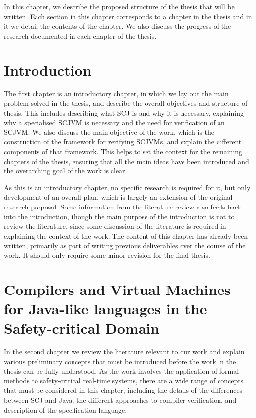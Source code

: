 \documentclass[a4paper,10pt]{report}
\begin{document}
In this chapter, we describe the proposed structure of the thesis that
will be written.
Each section in this chapter corresponds to a chapter in the thesis
and in it we detail the contents of the chapter.
We also discuss the progress of the research documented in each
chapter of the thesis.

\section{Introduction}

The first chapter is an introductory chapter, in which we lay out the
main problem solved in the thesis, and describe the overall objectives
and structure of thesis.
This includes describing what SCJ is and why it is necessary,
explaining why a specialised SCJVM is necessary and the need for
verification of an SCJVM.
We also discuss the main objective of the work, which is the
construction of the framework for verifying SCJVMs, and explain the
different components of that framework.
This helps to set the context for the remaining chapters of the
thesis, ensuring that all the main ideas have been introduced and the
overarching goal of the work is clear.

As this is an introductory chapter, no specific research is required
for it, but only development of an overall plan, which is largely an
extension of the original research proposal.
Some information from the literature review also feeds back into the
introduction, though the main purpose of the introduction is not to
review the literature, since some discussion of the literature is
required in explaining the context of the work.
The content of this chapter has already been written, primarily as
part of writing previous deliverables over the course of the work.
It should only require some minor revision for the final thesis.

\section{Compilers and Virtual Machines for Java-like languages in the
  Safety-critical Domain}

In the second chapter we review the literature relevant to our work
and explain various preliminary concepts that must be introduced
before the work in the thesis can be fully understood.
As the work involves the application of formal methods to
safety-critical real-time systems, there are a wide range of concepts
that must be considered in this chapter, including the details of the
differences between SCJ and Java, the different approaches to compiler
verification, and description of the \Circus{} specification language.
\end{document}
